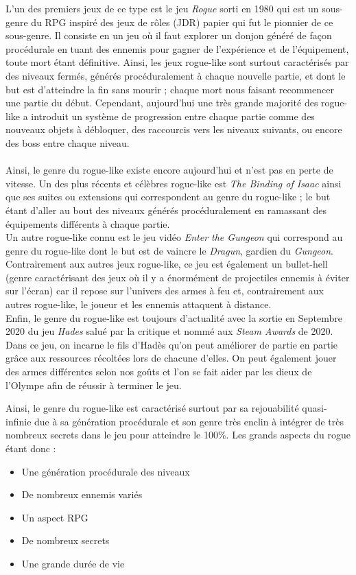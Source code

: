 \documentclass{article}
\begin{document}
L'un des premiers jeux de ce type est le jeu \textit{Rogue} sorti en 1980 qui est un sous-genre du RPG inspiré des jeux de rôles (JDR) papier qui fut le pionnier de ce sous-genre. Il consiste en un jeu où il faut explorer un donjon généré de façon procédurale en tuant des ennemis pour gagner de l'expérience et de l'équipement, toute mort étant définitive. Ainsi, les jeux rogue-like sont surtout caractérisés par des niveaux fermés, générés procéduralement à chaque nouvelle partie, et dont le but est d'atteindre la fin sans mourir ; chaque mort nous faisant recommencer une partie du début. Cependant, aujourd'hui une très grande majorité des rogue-like a introduit un système de progression entre chaque partie comme des nouveaux objets à débloquer, des raccourcis vers les niveaux suivants, ou encore des boss entre chaque niveau. \\
\\
Ainsi, le genre du rogue-like existe encore aujourd'hui et n'est pas en perte de vitesse. Un des plus récents et célèbres rogue-like est \textit{The Binding of Isaac} ainsi que ses suites ou extensions qui correspondent au genre du rogue-like ; le but étant d'aller au bout des niveaux générés procéduralement en ramassant des équipements différents à chaque partie. \\
Un autre rogue-like connu est le jeu vidéo \textit{Enter the Gungeon} qui correspond au genre du rogue-like dont le but est de vaincre le \textit{Dragun}, gardien du \textit{Gungeon}. Contrairement aux autres jeux rogue-like, ce jeu est également un bullet-hell (genre caractérisant des jeux où il y a énormément de projectiles ennemis à éviter sur l'écran) car il repose sur l'univers des armes à feu et, contrairement aux autres rogue-like, le joueur et les ennemis attaquent à distance. \\
Enfin, le genre du rogue-like est toujours d'actualité avec la sortie en Septembre 2020 du jeu \textit{Hades} salué par la critique et nommé aux \textit{Steam Awards} de 2020. Dans ce jeu, on incarne le fils d'Hadès qu'on peut améliorer de partie en partie grâce aux ressources récoltées lors de chacune d'elles. On peut également jouer des armes différentes selon nos goûts et l'on se fait aider par les dieux de l'Olympe afin de réussir à terminer le jeu. \pagebreak

Ainsi, le genre du rogue-like est caractérisé surtout par sa rejouabilité quasi-infinie due à sa génération procédurale et son genre très enclin à intégrer de très nombreux secrets dans le jeu pour atteindre le 100\%. Les grands aspects du rogue étant donc :
\begin{itemize}
    \item Une génération procédurale des niveaux
    \item De nombreux ennemis variés
    \item Un aspect RPG
    \item De nombreux secrets
    \item Une grande durée de vie
\end{itemize}
\end{document}
